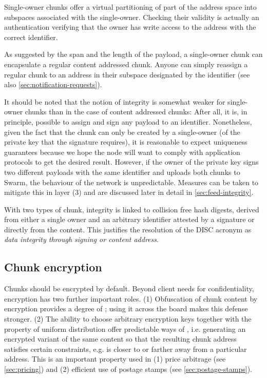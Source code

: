 Single-owner chunks offer a virtual partitioning of part of the address space into subspaces associated with the single-owner. Checking their validity is actually an authentication verifying that the owner has write access to the address with the correct identifier.

As suggested by the span and the length of the payload, a single-owner chunk can encapsulate a regular content addressed chunk. Anyone can simply reassign a regular chunk to an address in their subspace designated by the identifier (see also \ref{sec:notification-requests}).


It should be noted that the notion of integrity is somewhat weaker for single-owner chunks than in the case of content addressed chunks: After all, it is, in principle, possible to assign and sign any payload to an identifier. Nonetheless, given the fact that the chunk can only be created by a single-owner (of the private key that the signature requires), it is reasonable to expect uniqueness guarantees because we hope the node will want to comply with application protocols to get the desired result. However, if the owner of the private key signs two different payloads with the same identifier and uploads both chunks to Swarm, the behaviour of the network is unpredictable. Measures can be taken to mitigate this in layer (3) and are discussed later in detail in \ref{sec:feed-integrity}.

With two types of chunk, integrity is linked to collision free hash digests, derived from either a single owner and an arbitrary identifier attested by a signature or directly from the content. This justifies the resolution of the DISC acronym as \emph{data integrity through signing or content address}.

\subsection{Chunk encryption\statusgreen}\label{sec:chunk-encryption}

Chunks should be encrypted by default. Beyond client needs for confidentiality, encryption has two further important roles. (1) Obfuscation of chunk content by encryption provides a degree of ; using it across the board makes this defense stronger. (2) The ability to choose arbitrary encryption keys together with the property of uniform distribution offer predictable ways of , i.e. generating an encrypted variant of the same content so that the resulting chunk address satisfies certain constraints, e.g. is closer to or farther away from a particular address. This is an important property used in (1) price arbitrage (see \ref{sec:pricing}) and (2) efficient use of postage stamps (see \ref{sec:postage-stamps}).


